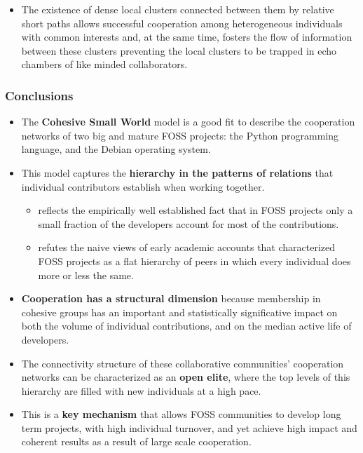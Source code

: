 \documentclass[ignorenonframetext,red,8pt,notes=hide]{beamer}
\begin{document}
\begin{frame}
{\begin{itemize}
\item The existence of dense local clusters connected between them by relative short paths allows successful cooperation among heterogeneous individuals with common interests and, at the same time, fosters the flow of information between these clusters preventing the local clusters to be trapped in echo chambers of like minded collaborators.
\end{itemize}
}

\end{frame}



\begin{frame}
\frametitle{Conclusions}

\begin{itemize}

\item The \textbf{Cohesive Small World} model is a good fit to describe the cooperation networks of two big and mature FOSS projects: the Python programming language, and the Debian operating system.

\item This model captures the \textbf{hierarchy in the patterns of relations} that individual contributors establish when working together.

\begin{itemize}
\item reflects the empirically well established fact that in FOSS projects only a small fraction of the developers account for most of the contributions.

\item refutes the naive views of early academic accounts that characterized FOSS projects as a flat hierarchy of peers in which every individual does more or less the same.
\end{itemize}

\item \textbf{Cooperation has a structural dimension} because membership in cohesive groups has an important and statistically significative impact on both the volume of individual contributions, and on the median active life of developers.

\item The connectivity structure of these collaborative communities' cooperation networks can be characterized as an \textbf{open elite}, where the top levels of this hierarchy are filled with new individuals at a high pace. 

\item This is a \textbf{key mechanism} that allows FOSS communities to develop long term projects, with high individual turnover, and yet achieve high impact and coherent results as a result of large scale cooperation.


\end{itemize}
\end{frame}
\end{document}
